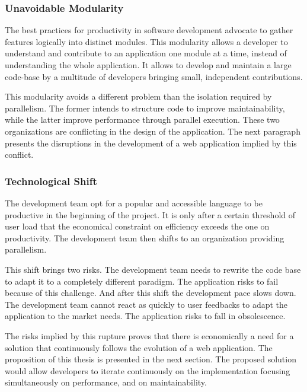 \subsubsection{Unavoidable Modularity}

The best practices for productivity in software development advocate to gather features logically into distinct modules.
This modularity allows a developer to understand and contribute to an application one module at a time, instead of understanding the whole application.
It allows to develop and maintain a large code-base by a multitude of developers bringing small, independent contributions.

This modularity avoids a different problem than the isolation required by parallelism.
The former intends to structure code to improve maintainability, while the latter improve performance through parallel execution.
These two organizations are conflicting in the design of the application.
The next paragraph presents the disruptions in the development of a web application implied by this conflict.

\subsubsection{Technological Shift}

The development team opt for a popular and accessible language to be productive in the beginning of the project. %
It is only after a certain threshold of user load that the economical constraint on efficiency exceeds the one on productivity.
The development team then shifts to an organization providing parallelism.

This shift brings two risks.
The development team needs to rewrite the code base to adapt it to a completely different paradigm.
The application risks to fail because of this challenge.
And after this shift the development pace slows down.
The development team cannot react as quickly to user feedbacks to adapt the application to the market needs.
The application risks to fall in obsolescence.

The risks implied by this rupture proves that there is economically a need for a solution that continuously follows the evolution of a web application.
The proposition of this thesis is presented in the next section.
The proposed solution would allow developers to iterate continuously on the implementation focusing simultaneously on performance, and on maintainability.

